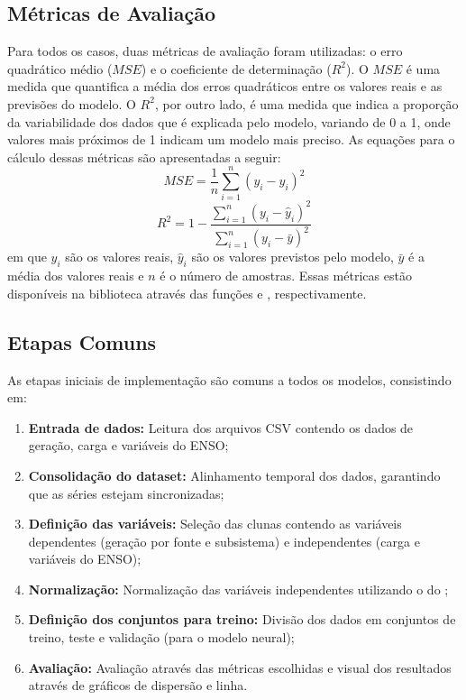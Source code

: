 \subsection{Métricas de Avaliação} %
Para todos os casos, duas métricas de avaliação foram utilizadas: o erro quadrático médio ($MSE$) e o coeficiente de determinação ($R^2$).
O $MSE$ é uma medida que quantifica a média dos erros quadráticos entre os valores reais e as previsões do modelo. O $R^2$, por outro lado, 
é uma medida que indica a proporção da variabilidade dos dados que é explicada pelo modelo, variando de 0 a 1, onde valores mais 
próximos de 1 indicam um modelo mais preciso. As equações para o cálculo dessas métricas são apresentadas a seguir:
\begin{equation}
    \label{eq:mse}
    MSE = \frac{1}{n} \sum_{i=1}^{n} (y_i - \hat{y}_i)^2
\end{equation}
\begin{equation}
    \label{eq:r2}
    R^2 = 1 - \frac{\sum_{i=1}^{n} (y_i - \hat{y}_i)^2}{\sum_{i=1}^{n} (y_i - \bar{y})^2}
\end{equation}
em que $ y_i $ são os valores reais, $ \hat{y}_i $ são os valores previstos pelo modelo, $ \bar{y} $ é a média dos valores 
reais e $ n $ é o número de amostras. Essas métricas estão disponíveis na biblioteca  através das
funções  e , respectivamente.

\subsection{Etapas Comuns} %
As etapas iniciais de implementação são comuns a todos os modelos, consistindo em: 
\begin{enumerate}
    \item \textbf{Entrada de dados:} Leitura dos arquivos CSV contendo os dados de geração, carga e variáveis do ENSO;
    \item \textbf{Consolidação do dataset:} Alinhamento temporal dos dados, garantindo que as séries estejam sincronizadas;
    \item \textbf{Definição das variáveis:} Seleção das clunas contendo as variáveis dependentes (geração por fonte e subsistema) e 
independentes (carga e variáveis do ENSO);
    \item \textbf{Normalização:} Normalização das variáveis independentes utilizando o  do ;
    \item \textbf{Definição dos conjuntos para treino:} Divisão dos dados em conjuntos de treino, teste e validação (para o modelo neural);
    \item \textbf{Avaliação:} Avaliação através das métricas escolhidas e visual dos resultados através de gráficos de dispersão e linha.
\end{enumerate}

